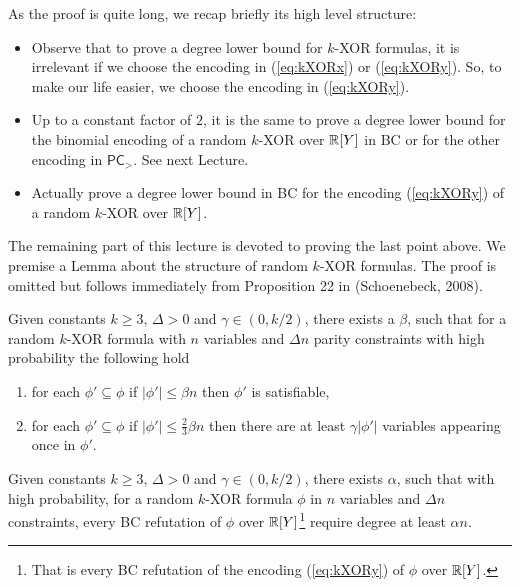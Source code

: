 \documentclass[a4paper,twoside,justified]{tufte-handout}
\begin{document}
As the proof is quite long, we recap briefly its high level structure:
\begin{itemize}
\item Observe that to prove a degree lower bound for $k$-XOR formulas, it is irrelevant if we choose the encoding in (\ref{eq:kXORx}) or (\ref{eq:kXORy}). 
So, to make our life easier, we choose the encoding in (\ref{eq:kXORy}).
\item Up to a constant factor of $2$, it is the same to prove a degree lower bound for the binomial encoding of a random $k$-XOR over $\mathbb{R}[Y]$ in BC or for the other encoding in $\mathsf{PC}_>$. See next Lecture.
\item Actually prove a degree lower bound in BC for the encoding (\ref{eq:kXORy}) of a random $k$-XOR over $\mathbb{R}[Y]$.
\end{itemize}

The remaining part of this lecture is devoted to proving the last
point above. We premise a Lemma about the structure of random $k$-XOR
formulas. The proof is omitted but follows immediately from
Proposition 22 in (Schoenebeck, 2008)\cite{schoenebeck2008linear}.
 

\begin{lemma}\label{lem:kXORsat}
Given constants $k\geq 3$, $\Delta>0$ and $\gamma\in (0,k/2)$, there exists a $\beta$, such that for a random $k$-XOR formula with $n$ variables and $\Delta n$ parity constraints with high probability the following hold
\begin{enumerate}
\item for each $\phi'\subseteq \phi$ if $|\phi'|\leq \beta n$ then $\phi'$ is satisfiable,
\item for each $\phi'\subseteq \phi$ if $|\phi'|\leq \frac{2}{3}\beta n$ then there are at least $\gamma |\phi'|$ variables appearing once in $\phi'$.
\end{enumerate}

\end{lemma}

\begin{theorem}
Given constants $k\geq 3$, $\Delta>0$ and $\gamma \in (0,k/2)$, there exists $\alpha$, such that 
with high probability, for a random $k$-XOR formula $\phi$ in $n$ variables and $\Delta n$ constraints,
every BC refutation of $\phi$ over $\mathbb{R}[Y]$\footnote{
That is every BC refutation of the encoding (\ref{eq:kXORy}) of $\phi$ over $\mathbb{R}[Y]$.
} 
require degree at least $\alpha n$.
\end{theorem}
\end{document}
